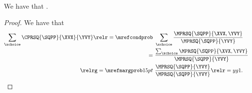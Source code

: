 \begin{proposition}
  We have that \sqcprobsumone.%
\end{proposition}

\begin{proof}
  We have that
  \begin{align*}
    \sum_{\xchoice}\CPRSQ{\SQPP}{\XVX}{\YVY} \relr = {\mrefcondprob} &\ \sum_{\xchoice}\frac{\MPRSQ{\SQPP}{\XVX, \YVY}}{\MPRSQ{\SQPP}{\YVY}}\\
    = &\ \frac{\sum_{\xchoice}\MPRSQ{\SQPP}{\XVX, \YVY}}{\MPRSQ{\SQPP}{\YVY}}\\
    \relrg = {\mrefmargprob} 15pt &\ \frac{\MPRSQ{\SQPP}{\YVY}}{\MPRSQ{\SQPP}{\YVY}} \relr = yg 1.
  \end{align*}
\end{proof}
